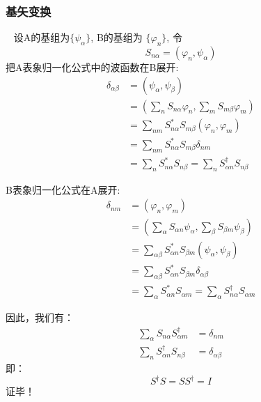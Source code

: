 \begin{frame} 
    \frametitle{基矢变换}
    \例[16、试证明量子力学不同表象基组之间的变换是幺正变换]{}  
    \证~ 设A的基组为$\{\psi_\alpha \}$, B的基组为 $\{\varphi_n\}$, 令
      \[ S_{n\alpha} = (\varphi_n , \psi_\alpha) \]
     把A表象归一化公式中的波函数在B展开: 
    \begin{equation*}
        \begin{split}
            \delta_{\alpha\beta} &= (\psi_\alpha, \psi_\beta) \\
            &= (\sum_n S_{n\alpha} \varphi_n, \sum_m S_{m\beta} \varphi_m)\\
            &= \sum_{nm} S_{n\alpha} ^* S_{m\beta}(\varphi_n, \varphi_m)\\
            &= \sum_{nm} S_{n\alpha} ^* S_{m\beta}\delta_{nm}\\
            &= \sum_{n} S_{n\alpha} ^* S_{n\beta} = \sum_{n} S^{\dagger } _{\alpha n} S_{n\beta}
        \end{split} 
    \end{equation*}
\end{frame}

\begin{frame} 
    B表象归一化公式在A展开: 
    \begin{equation*}
        \begin{split}
            \delta_{n m} &= (\varphi_n, \varphi_m) \\
            &= (\sum_\alpha S_{ \alpha n} \psi_\alpha, \sum_\beta S_{\beta m} \psi_\beta)\\
            &= \sum_{\alpha\beta } S_{\alpha n} ^* S_{\beta m }(\psi_\alpha, \psi_\beta)\\
            &= \sum_{\alpha\beta } S_{\alpha n} ^* S_{\beta m}\delta_{\alpha\beta}\\
            &= \sum_{\alpha} S_{\alpha n} ^* S_{ \alpha m } = \sum_{\alpha} S^{\dagger } _{n \alpha } S_{\alpha m }
        \end{split} 
    \end{equation*}
\end{frame}

\begin{frame} 
    因此，我们有：
    \begin{equation*}
        \begin{split}
            \sum_{\alpha} S_{n\alpha}   S^{\dagger } _{\alpha m} &=\delta_{nm} \\
            \sum_{n} S^{\dagger } _{\alpha n} S_{n\beta}&=\delta_{\alpha\beta}
        \end{split} 
    \end{equation*}
    即：$$ S^{\dagger }S=SS^{\dagger } =I$$ 
    证毕！ \\
\end{frame}


